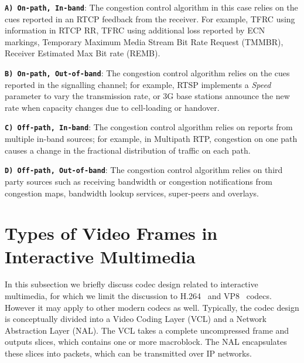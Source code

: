 \textbf{\texttt{A) On-path, In-band}}: The congestion control algorithm in
this case relies on the cues reported in an RTCP feedback from the receiver.
For example, TFRC using information in RTCP RR, TFRC using additional loss
reported by ECN markings, Temporary Maximum Media Stream Bit Rate Request
(TMMBR), Receiver Estimated Max Bit rate (REMB).

\textbf{\texttt{B) On-path, Out-of-band}}: The congestion control algorithm
relies on the cues reported in the signalling channel; for example, RTSP implements
a \emph{Speed} parameter to vary the transmission rate, or 3G base stations announce
the new rate when capacity changes due to cell-loading or handover.


\textbf{\texttt{C) Off-path, In-band}}: The congestion control algorithm
relies on reports from multiple in-band sources; for example, in Multipath
RTP, congestion on one path causes a change in the fractional distribution of
traffic on each path.

\textbf{\texttt{D) Off-path, Out-of-band}}: The congestion control
algorithm relies on third party sources such as receiving bandwidth or
congestion notifications from congestion maps, bandwidth lookup services,
super-peers and overlays.




\section{Types of Video Frames in Interactive Multimedia}

In this subsection we briefly discuss codec design related to interactive
multimedia, for which we limit the discussion to H.264~\cite{h264} and
VP8~\cite{rfc6386} codecs. However it may apply to other modern codecs as well.
Typically, the codec design is conceptually divided into a Video Coding Layer
(VCL) and a Network Abstraction Layer (NAL). The VCL takes a complete
uncompressed frame and outputs slices, which contains one or more macroblock.
The NAL encapsulates these slices into packets, which can be transmitted over IP
networks.

